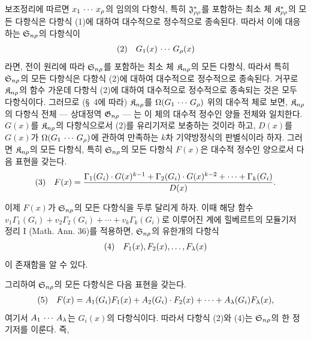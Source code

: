보조정리에 따르면 $x_1\,\cdots\, x_\rho$의 임의의 다항식, 특히 $\mathfrak J^*_{\rho\rho}$를 포함하는 최소 체 $\mathfrak K^*_{\rho\rho}$의 모든 다항식은 다항식 (1)에 대하여 대수적으로 정수적으로 종속된다. 따라서 이에 대응하는 $\mathfrak S_{n\rho}$의 다항식이
\[
\begin{array}{@{}l@{\quad}c@{}}
(2)& G_1(x)\rcdots G_\rho(x)
\end{array}
\]
라면, 전이 원리에 따라 $\mathfrak S_{n\rho}$를 포함하는 최소 체 $\mathfrak K_{n\rho}$의 모든 다항식, 따라서 특히 $\mathfrak S_{n\rho}$의 모든 다항식은 다항식 (2)에 대하여 대수적으로 정수적으로 종속된다. 거꾸로 $\mathfrak K_{n\rho}$의 함수 가운데 다항식 (2)에 대하여 대수적으로 정수적으로 종속되는 것은 모두 다항식이다. 그러므로 (\S\ 4에 따라) $\mathfrak K_{n\rho}$를 $\Omega(G_1\,\cdots\, G_\rho)$ 위의 대수적 체로 보면, $\mathfrak K_{n\rho}$의 다항식 전체 --- 상대정역 $\mathfrak G_{n\rho}$ --- 는 이 체의 대수적 정수인 양들 전체와 일치한다. $G(x)$를 $\mathfrak K_{n\rho}$의 다항식으로서 (2)를 유리기저로 보충하는 것이라 하고, $D(x)$를 $G(x)$가 $\Omega(G_1\,\cdots\, G_\rho)$에 관하여 만족하는 $k$차 기약방정식의 판별식이라 하자. 그러면 $\mathfrak K_{n\rho}$의 모든 다항식, 특히 $\mathfrak S_{n\rho}$의 모든 다항식 $F(x)$은 대수적 정수인 양으로서 다음 표현을 갖는다.
\[
\begin{array}{@{}l@{\quad}c@{}}
(3)& \displaystyle F(x)=\frac{\Gamma_1(G_i)\cdot G(x)^{k-1}+\Gamma_2(G_i)\cdot G(x)^{k-2}+\cdots+\Gamma_k(G_i)}{D(x)}.
\end{array}
\]

이제 $F(x)$가 $\mathfrak S_{n\rho}$의 모든 다항식을 두루 달리게 하자. 이때 해당 함수 $v_1\Gamma_1(G_i)+v_2\Gamma_2(G_i)+\cdots+v_k\Gamma_k(G_i)$로 이루어진 계에 힐베르트의 모듈기저 정리 I (Math. Ann. 36)를 적용하면, $\mathfrak S_{n\rho}$의 유한개의 다항식
\[
\begin{array}{@{}l@{\quad}c@{}}
(4)& F_1(x),F_2(x),\ldots,F_\lambda(x)
\end{array}
\]
이 존재함을 알 수 있다.

그리하여 $\mathfrak S_{n\rho}$의 모든 다항식은 다음 표현을 갖는다.
\[
\begin{array}{@{}l@{\quad}c@{}}
(5)& F(x)=A_1(G_i)F_1(x)+A_2(G_i)\cdot F_2(x)+\cdots+A_\lambda(G_i)F_\lambda(x),
\end{array}
\]
여기서 $A_1\,\cdots\, A_\lambda$는 $G_i(x)$의 다항식이다. 따라서 다항식 (2)와 (4)는 $\mathfrak S_{n\rho}$의 한 정기저를 이룬다. 즉,

